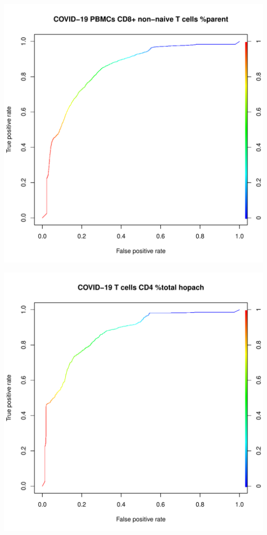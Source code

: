 \documentclass[11pt,a4paper,twoside]{report}\usepackage[]{graphicx}\usepackage[]{color}
\makeatletter
\def\maxwidth{ %
  \ifdim\Gin@nat@width>\linewidth
    \linewidth
  \else
    \Gin@nat@width
  \fi
}
\newenvironment{knitrout}{}{} %
\makeatother
\begin{document}
\begin{knitrout}
\includegraphics[width=\maxwidth]{figure/fig_code-9} 

\includegraphics[width=\maxwidth]{figure/fig_code-10} 


\end{knitrout}
\end{document}
